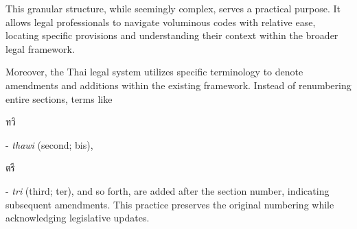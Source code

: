 This granular structure, while seemingly complex, serves a practical purpose. It allows legal professionals to navigate voluminous codes with relative ease, locating specific provisions and understanding their context within the broader legal framework.

Moreover, the Thai legal system utilizes specific terminology to denote amendments and additions within the existing framework. Instead of renumbering entire sections, terms like \begin{thai}ทวิ\end{thai} - \textit{thawi} (second; bis), \begin{thai}ตรี\end{thai} - \textit{tri} (third; ter), and so forth, are added after the section number, indicating subsequent amendments. This practice preserves the original numbering while acknowledging legislative updates.





